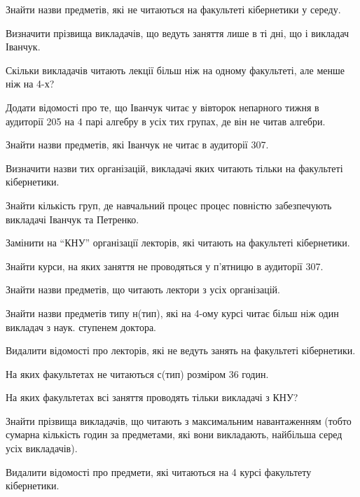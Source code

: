 \begin{card}
    \item Знайти назви предметів, які не читаються на факультеті кібернетики у середу.
    \item Визначити прізвища викладачів, що ведуть заняття лише в ті дні, що і викладач Іванчук.
    \item Скільки викладачів читають лекції більш ніж на одному факультеті, але менше ніж на 4-х?
    \item Додати відомості про те, що Іванчук читає у вівторок непарного тижня в аудиторії 205 на 4 парі алгебру в усіх тих групах, де він не читав алгебри.
\end{card}

\begin{card}
    \item Знайти назви предметів, які Іванчук не читає в аудиторії 307.
    \item Визначити назви тих організацій, викладачі яких читають тільки на факультеті кібернетики.
    \item Знайти кількість груп, де навчальний процес процес повністю забезпечують викладачі Іванчук та Петренко.
    \item Замінити на ``КНУ'' організації лекторів, які читають на факультеті кібернетики.
\end{card}

\begin{card}
    \item Знайти курси, на яких заняття не проводяться у п'ятницю в аудиторії 307.
    \item Знайти назви предметів, що читають лектори з усіх організацій.
    \item Знайти назви предметів типу н (тип), які на 4-ому курсі читає більш ніж один викладач з наук. ступенем доктора.
    \item Видалити відомості про лекторів, які не ведуть занять на факультеті кібернетики.
\end{card}

\begin{card}
    \item На яких факультетах не читаються с (тип) розміром 36 годин.
    \item На яких факультетах всі заняття проводять тільки викладачі з КНУ?
    \item Знайти прізвища викладачів, що читають з максимальним навантаженням (тобто сумарна кількість годин за предметами, які вони викладають, найбільша серед усіх викладачів).
    \item Видалити відомості про предмети, які читаються на 4 курсі факультету кібернетики.
\end{card}

